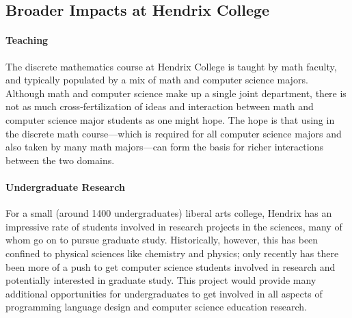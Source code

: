 \subsection{Broader Impacts at Hendrix College}
\label{subsec:broader_impacts_at_hendrix_college}

\paragraph{Teaching}  The discrete mathematics course at Hendrix
College is taught by math faculty, and typically populated by a mix of
math and computer science majors.  Although math and computer science
make up a single joint department, there is not as much
cross-fertilization of ideas and interaction between math and computer
science major students as one might hope.  The hope is that
using \thelang in the discrete math course---which is required for all
computer science majors and also taken by many math majors---can form
the basis for richer interactions between the two domains.

\paragraph{Undergraduate Research}  For a small (around 1400
undergraduates) liberal arts college, Hendrix has an impressive rate
of students involved in research projects in the sciences, many of
whom go on to pursue graduate study.  Historically, however, this has
been confined to physical sciences like chemistry and physics; only
recently has there been more of a push to get computer science
students involved in research and potentially interested in graduate
study.  This project would provide many additional opportunities for
undergraduates to get involved in all aspects of programming language
design and computer science education research.
